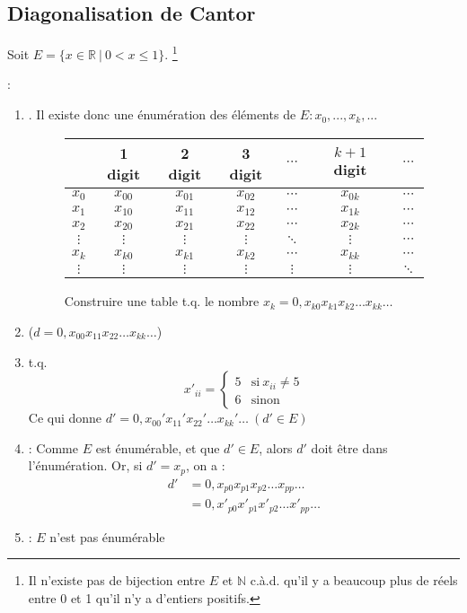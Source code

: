 \subsection{Diagonalisation de Cantor}

Soit $E = \{x \in \mathbb{R} \ | \ 0 < x \leq 1\}$. \footnote{Il n'existe pas de bijection entre $E$ et $\mathbb{N}$ c.à.d. qu'il y a beaucoup plus de réels entre 0 et 1 qu'il n'y a d'entiers positifs.}

 :
\begin{enumerate}
\item {}. Il existe donc une énumération des éléments de $E : x_0, ..., x_k, ...$
\begin{figure}[H]
    	\centering
    	\begin{tabular}{c|cccccc}
	 & 1 digit & 2 digit & 3 digit & $\cdots$ & $k+1$ digit & $\cdots$ \\ 
	\hline 
	$x_0$ & $x_{00}$ & $x_{01}$ & $x_{02}$ & $\cdots$ & $x_{0k}$ & $\cdots$ \\ 
	$x_1$ & $x_{10}$ & $x_{11}$ & $x_{12}$ & $\cdots$ & $x_{1k}$ & $\cdots$ \\ 
	$x_2$ & $x_{20}$ & $x_{21}$ & $x_{22}$ & $\cdots$ & $x_{2k}$ & $\cdots$ \\ 
	$\vdots$ & $\vdots$ & $\vdots$ & $\vdots$ & $\ddots$ & $\vdots$ & $\cdots$ \\ 
	$x_k$ & $x_{k0}$ & $x_{k1}$ & $x_{k2}$ & $\cdots$ & $x_{kk}$ & $\cdots$ \\ 
	$\vdots$ & $\vdots$ & $\vdots$ & $\vdots$ & $\vdots$ & $\vdots$ & $\ddots$ \\ 
	\end{tabular}
	\caption{Construire une table t.q. le nombre $x_k = 0,x_{k0} x_{k1} x_{k2} \ldots x_{kk} \ldots$}
\end{figure}
\item {} ($d = 0,x_{00} x_{11} x_{22} \ldots x_{kk} \ldots$)
\item {} t.q.
\begin{equation*}
	x'_{ii}=
	\begin{cases}
      	5 & \text{si}\ x_{ii} \neq 5 \\
      	6 & \text{sinon}
    \end{cases}
\end{equation*}
Ce qui donne $d' =  0,x_{00}' x_{11}' x_{22}' \ldots x_{kk}' \ldots \ (d' \in E)$
\item {} : Comme $E$ est énumérable, et que $d' \in E$, alors $d'$ doit être dans l'énumération. Or, si $d' = x_p$, on a :
\begin{align*}
	d' &= 0,x_{p0} x_{p1} x_{p2} \ldots x_{pp} \ldots\\
	   &= 0,x'_{p0} x'_{p1} x'_{p2} \ldots x'_{pp} \ldots
\end{align*}
\item {} : $E$ n'est pas énumérable
\end{enumerate}

